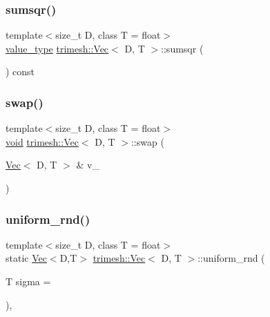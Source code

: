\mbox{\label{classtrimesh_1_1Vec_a5ea80c490c3c14e11580be1931a77f0b}} 
\subsubsection{\texorpdfstring{sumsqr()}{sumsqr()}}
{\footnotesize\ttfamily template$<$size\+\_\+t D, class T = float$>$ \\
\hyperlink{classtrimesh_1_1Vec_a10a59253996e42d67c713f37592669df}{value\+\_\+type} \hyperlink{classtrimesh_1_1Vec}{trimesh\+::\+Vec}$<$ D, T $>$\+::sumsqr (\begin{DoxyParamCaption}{ }\end{DoxyParamCaption}) const\hspace{0.3cm}{\ttfamily [inline]}}

\mbox{\label{classtrimesh_1_1Vec_aeabbb3531ef4be7bf41dd3c3628f7a54}} 
\subsubsection{\texorpdfstring{swap()}{swap()}}
{\footnotesize\ttfamily template$<$size\+\_\+t D, class T = float$>$ \\
\hyperlink{namespacetrimesh_a784ddfd979e1c579bda795a8edfc3f43}{void} \hyperlink{classtrimesh_1_1Vec}{trimesh\+::\+Vec}$<$ D, T $>$\+::swap (\begin{DoxyParamCaption}\item[{\hyperlink{classtrimesh_1_1Vec}{Vec}$<$ D, T $>$ \&}]{v\+\_\+ }\end{DoxyParamCaption})\hspace{0.3cm}{\ttfamily [inline]}}

\mbox{\label{classtrimesh_1_1Vec_a3fe9704a243014c011b439aa9009f6cf}} 
\subsubsection{\texorpdfstring{uniform\+\_\+rnd()}{uniform\_rnd()}}
{\footnotesize\ttfamily template$<$size\+\_\+t D, class T = float$>$ \\
static \hyperlink{classtrimesh_1_1Vec}{Vec}$<$D,T$>$ \hyperlink{classtrimesh_1_1Vec}{trimesh\+::\+Vec}$<$ D, T $>$\+::uniform\+\_\+rnd (\begin{DoxyParamCaption}\item[{T}]{sigma = {} }\end{DoxyParamCaption})\hspace{0.3cm}{\ttfamily [inline]}, {\ttfamily [static]}}



